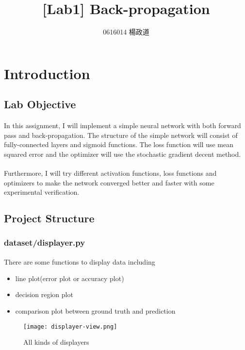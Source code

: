 \title{[Lab1] Back-propagation}
\author{0616014 楊政道}
\maketitle
\thispagestyle{fancy}
\section{Introduction}
\subsection{Lab Objective}
\paragraph{}
In this assignment, I will implement a simple neural network with both forward pass and back-propagation. The structure of the simple network will consist of fully-connected layers and sigmoid functions. The loss function will use mean squared error and the optimizer will use the stochastic gradient decent method.
\paragraph{}
Furthermore, I will try different activation functions, loss functions and optimizers to make the network converged better and faster with some experimental verification.
\subsection{Project Structure}
\subsubsection{dataset/displayer.py}
\paragraph{}
There are some functions to display data including
\begin{itemize}
    \item line plot(error plot or accuracy plot)
    \item decision region plot
    \item comparison plot between ground truth and prediction
\end{itemize}
\begin{figure}[!ht]
\begin{center} 
\texttt{[image: displayer-view.png]} 
\caption{All kinds of displayers}
\end{center} 
\end{figure} 
